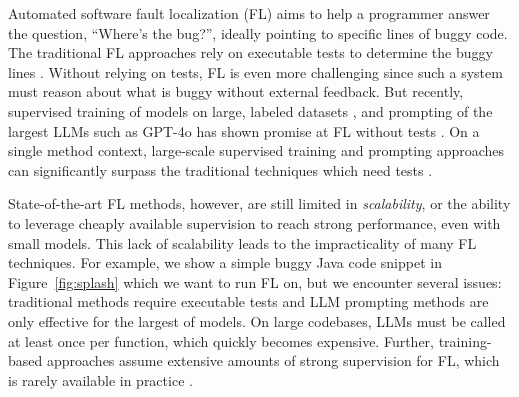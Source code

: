 Automated software fault localization (FL) aims to help a programmer answer the question, ``Where's the bug?'', ideally pointing to specific lines of buggy code.
The traditional FL approaches rely on executable tests to determine the buggy lines \cite{usestaticanalysis}.
Without relying on tests, FL is even more challenging since such a system must reason about what is buggy without external feedback. But recently,
supervised training of models on large, labeled datasets \citep{llmao, transferfl}, and prompting of the largest LLMs such as GPT-4o has shown promise at FL without tests \citep{wu2023large}.
On a single method context, large-scale supervised training and prompting approaches can significantly surpass the traditional techniques which need tests \citep{llmao, wu2023large}.


State-of-the-art FL methods, however, are still limited in \textit{scalability}, or the ability to leverage cheaply available supervision to reach strong performance, even with small models. This lack of scalability leads to the impracticality of many FL techniques.
For example, we show a simple buggy Java code snippet in Figure~\ref{fig:splash} which we want to run FL on, but we encounter several issues: traditional methods require executable tests and LLM prompting methods are only effective for the largest of models. On large codebases, LLMs must be called at least once per function, which quickly becomes expensive. Further, training-based approaches assume extensive amounts of strong supervision for FL, which is rarely available in practice \citep{well}.



